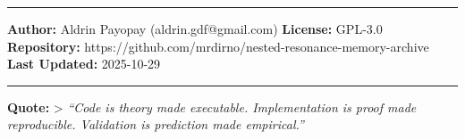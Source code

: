 \documentclass[
]{article}
\begin{document}
\begin{center}\rule{0.5\linewidth}{0.5pt}\end{center}

\textbf{Author:} Aldrin Payopay (aldrin.gdf@gmail.com) \textbf{License:}
GPL-3.0 \textbf{Repository:}
https://github.com/mrdirno/nested-resonance-memory-archive \textbf{Last
Updated:} 2025-10-29

\begin{center}\rule{0.5\linewidth}{0.5pt}\end{center}

\textbf{Quote:} \textgreater{} \emph{``Code is theory made executable.
Implementation is proof made reproducible. Validation is prediction made
empirical.''}
\end{document}
